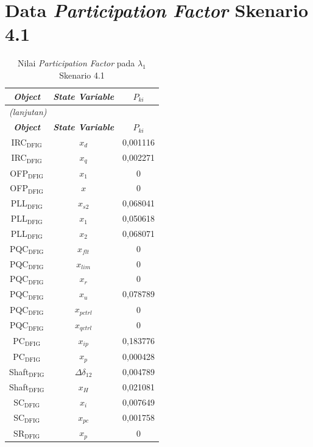 \section{Data \textit{Participation Factor} Skenario 4.1}
\begingroup
\fontsize{12}{14.4}\selectfont
\setlength{\tabcolsep}{8pt}
\begin{longtable}{c c c} \caption[]{Nilai
	\textit{Participation Factor} pada $\lambda_1$ Skenario 4.1}
	\label{tab:prf_sk41_lampiran} \\
	\toprule
	\multicolumn{1}{c}{\textbf{\textit{Object}}} & \textbf{\textit{State
	Variable}} & \textbf{$P_{ki}$} \\
	\midrule
	\endfirsthead
	\multicolumn{3}{l}{\textit{(lanjutan)}} \\
	\toprule
	\multicolumn{1}{c}{\textbf{\textit{Object}}} & \textbf{\textit{State
	Variable}} & \textbf{$P_{ki}$} \\
	\midrule
	\endhead
	\bottomrule
	\endfoot
	IRC$_\text{DFIG}$ & $x_d$ & 0,001116  \\
	IRC$_\text{DFIG}$ & $x_q$ & 0,002271  \\
	OFP$_\text{DFIG}$ & $x_1$ & 0         \\
	OFP$_\text{DFIG}$ & $x$ & 0         \\
	PLL$_\text{DFIG}$ & $x_{s2}$ & 0,068041  \\
	PLL$_\text{DFIG}$ & $x_1$ & 0,050618  \\
	PLL$_\text{DFIG}$ & $x_2$ & 0,068071  \\
	PQC$_\text{DFIG}$ & $x_{flt}$ & 0         \\
	PQC$_\text{DFIG}$ & $x_{lim}$ & 0         \\
	PQC$_\text{DFIG}$ & $x_r$ & 0         \\
	PQC$_\text{DFIG}$ & $x_u$ & 0,078789  \\
	PQC$_\text{DFIG}$ & $x_{pctrl}$ & 0         \\
	PQC$_\text{DFIG}$ & $x_{qctrl}$ & 0         \\
	PC$_\text{DFIG}$ & $x_{ip}$ & 0,183776  \\
	PC$_\text{DFIG}$ & $x_p$ & 0,000428  \\
	Shaft$_\text{DFIG}$ & $\Delta\delta_{12}$ & 0,004789  \\
	Shaft$_\text{DFIG}$ & $x_H$ & 0,021081  \\
	SC$_\text{DFIG}$ & $x_i$ & 0,007649  \\
	SC$_\text{DFIG}$ & $x_{pc}$ & 0,001758  \\
	SR$_\text{DFIG}$ & $x_p$ & 0         \\

\end{longtable}
